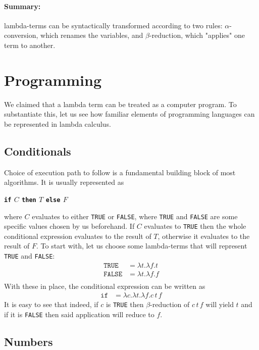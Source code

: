 \documentclass[11pt,twoside,a4paper]{article} %
\newcommand{\kw}[1]{\bf{\texttt{#1}}}
\newcommand{\sym}[1]{\texttt{#1}}
\newcommand{\msym}[1]{\mathtt{#1}}
\begin{document}
\paragraph{Summary:} lambda-terms can be syntactically transformed according to 
two rules: $\alpha$-conversion, which renames the variables, and $\beta$-reduction,
which "applies" one term to another.

\section{Programming}

We claimed that a lambda term can be treated as a computer program. To substantiate 
this, let us see how familiar elements of programming languages can be represented 
in lambda calculus.

\subsection{Conditionals}

Choice of execution path to follow is a fundamental building block of most
algorithms. It is usually represented as 
\begin{center}
\kw{if} $C$ \kw{then} $T$ \kw{else} $F$
\end{center}
where $C$ evaluates to either \sym{TRUE} or \sym{FALSE}, where \sym{TRUE} and 
\sym{FALSE} are some specific values chosen by us beforehand. If $C$ evaluates 
to \sym{TRUE} then the whole conditional expression evaluates to the result of 
$T$, otherwise it evaluates to the result of $F$. To start with, let us choose 
some lambda-terms that will represent \sym{TRUE} and \sym{FALSE}:
\begin{align*}
\msym{TRUE}  &= \lambda t.\lambda f.t \\
\msym{FALSE} &= \lambda t.\lambda f.f \\
\end{align*}
With these in place, the conditional expression can be written as
\begin{align*}
\msym{if} &= \lambda c.\lambda t.\lambda f.c\,t\,f
\end{align*}
It is easy to see that indeed, if $c$ is \sym{TRUE} then $\beta$-reduction of
$c\,t\,f$ will yield $t$ and if it is \sym{FALSE} then said application will
reduce to $f$.

\subsection{Numbers}
\end{document}
